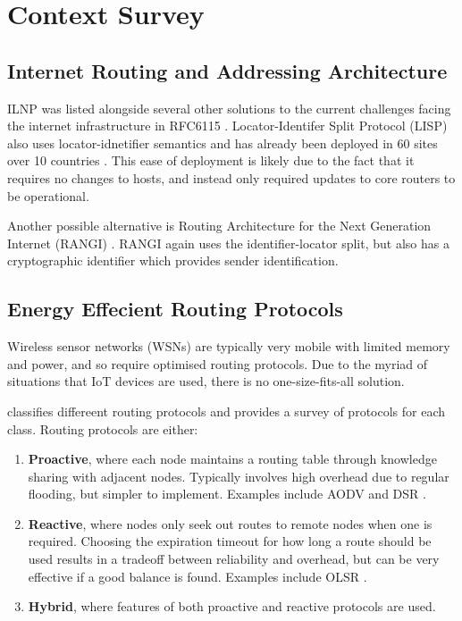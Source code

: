\documentclass[12pt]{article}
\begin{document}
\section{Context Survey}

\subsection{Internet Routing and Addressing Architecture}

ILNP was listed alongside several other solutions to the current challenges facing the internet infrastructure in RFC6115 \cite{rfc6115}. Locator-Identifer Split Protocol (LISP) also uses locator-idnetifier semantics and has already been deployed in 60 sites over 10 countries \cite{nahla}. This ease of deployment is likely due to the fact that it requires no changes to hosts, and instead only required updates to core routers to be operational. 

Another possible alternative is Routing Architecture for the Next Generation Internet (RANGI) \cite{rangi}. RANGI again uses the identifier-locator split, but also has a cryptographic identifier which provides sender identification. 

\subsection{Energy Effecient Routing Protocols}

Wireless sensor networks (WSNs) are typically very mobile with limited memory and power, and so require optimised routing protocols. Due to the myriad of situations that IoT devices are used, there is no one-size-fits-all solution. 

\cite{hassan} classifies differeent routing protocols and provides a survey of protocols for each class. Routing protocols are either:
\begin{enumerate}
    \item \textbf{Proactive}, where each node maintains a routing table through knowledge sharing with adjacent nodes. Typically involves high overhead due to regular flooding, but simpler to implement.
        Examples include AODV \cite{aodv} and DSR \cite{dsr}.

    \item \textbf{Reactive}, where nodes only seek out routes to remote nodes when one is required. Choosing the expiration timeout for how long a route should be used results in a tradeoff between reliability and overhead, but can be very effective if a good balance is found.
        Examples include OLSR \cite{olsr}.
    \item \textbf{Hybrid}, where features of both proactive and reactive protocols are used.
\end{enumerate}
\end{document}
